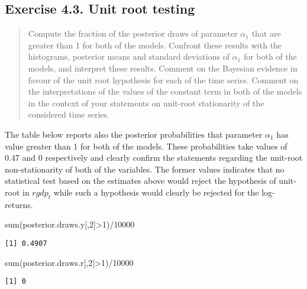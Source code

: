 \documentclass[
  letterpaper,
  DIV=11,
  numbers=noendperiod]{scrreprt}
\newenvironment{Shaded}{\begin{snugshade}}{\end{snugshade}}
\newcommand{\DecValTok}[1]{\textcolor[rgb]{0.68,0.00,0.00}{#1}}
\newcommand{\FunctionTok}[1]{\textcolor[rgb]{0.28,0.35,0.67}{#1}}
\newcommand{\NormalTok}[1]{\textcolor[rgb]{0.00,0.23,0.31}{#1}}
\newcommand{\SpecialCharTok}[1]{\textcolor[rgb]{0.37,0.37,0.37}{#1}}
\begin{document}
\hypertarget{exercise-4.3.-unit-root-testing}{%
\subsection*{Exercise 4.3. Unit root
testing}\label{exercise-4.3.-unit-root-testing}}

\begin{quote}
Compute the fraction of the posterior draws of parameter \(\alpha_1\)
that are greater than 1 for both of the models. Confront these results
with the histograms, posterior means and standard deviations of
\(\alpha_1\) for both of the models, and interpret these results.
Comment on the Bayesian evidence in favour of the unit root hypothesis
for each of the time series. Comment on the interpretations of the
values of the constant term in both of the models in the context of your
statements on unit-root stationarity of the considered time series.
\end{quote}

The table below reports also the posterior probabilities that parameter
\(\alpha_1\) has value greater than 1 for both of the models. These
probabilities take values of 0.47 and 0 respectively and clearly confirm
the statements regarding the unit-root non-stationarity of both of the
variables. The former values indicates that no statistical test based on
the estimates above would reject the hypothesis of unit-root in
\(rgdp_t\) while such a hypothesis would clearly be rejected for the
log-returns.

\begin{Shaded}
\begin{Highlighting}[]
\FunctionTok{sum}\NormalTok{(posterior.draws.y[,}\DecValTok{2}\NormalTok{]}\SpecialCharTok{\textgreater{}}\DecValTok{1}\NormalTok{)}\SpecialCharTok{/}\DecValTok{10000}
\end{Highlighting}
\end{Shaded}

\begin{verbatim}
[1] 0.4907
\end{verbatim}

\begin{Shaded}
\begin{Highlighting}[]
\FunctionTok{sum}\NormalTok{(posterior.draws.r[,}\DecValTok{2}\NormalTok{]}\SpecialCharTok{\textgreater{}}\DecValTok{1}\NormalTok{)}\SpecialCharTok{/}\DecValTok{10000}
\end{Highlighting}
\end{Shaded}

\begin{verbatim}
[1] 0
\end{verbatim}
\end{document}
